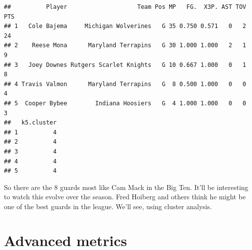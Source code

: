 \documentclass[]{book}
\newenvironment{Shaded}{\begin{snugshade}}{\end{snugshade}}
\newcommand{\DecValTok}[1]{\textcolor[rgb]{0.00,0.00,0.81}{#1}}
\newcommand{\KeywordTok}[1]{\textcolor[rgb]{0.13,0.29,0.53}{\textbf{#1}}}
\newcommand{\NormalTok}[1]{#1}
\newcommand{\OperatorTok}[1]{\textcolor[rgb]{0.81,0.36,0.00}{\textbf{#1}}}
\newcommand{\StringTok}[1]{\textcolor[rgb]{0.31,0.60,0.02}{#1}}
\begin{document}
\begin{Shaded}
\end{Shaded}

\begin{verbatim}
##          Player                    Team Pos MP   FG.  X3P. AST TOV PTS
## 1   Cole Bajema     Michigan Wolverines   G 35 0.750 0.571   0   2  24
## 2    Reese Mona      Maryland Terrapins   G 30 1.000 1.000   2   1   9
## 3   Joey Downes Rutgers Scarlet Knights   G 10 0.667 1.000   0   1   8
## 4 Travis Valmon      Maryland Terrapins   G  8 0.500 1.000   0   0   4
## 5  Cooper Bybee        Indiana Hoosiers   G  4 1.000 1.000   0   0   3
##   k5.cluster
## 1          4
## 2          4
## 3          4
## 4          4
## 5          4
\end{verbatim}

So there are the 8 guards most like Cam Mack in the Big Ten. It'll be interesting to watch this evolve over the season. Fred Hoiberg and others think he might be one of the best guards in the league. We'll see, using cluster analysis.

\hypertarget{advanced-metrics}{%
\section{Advanced metrics}\label{advanced-metrics}}
\end{document}
